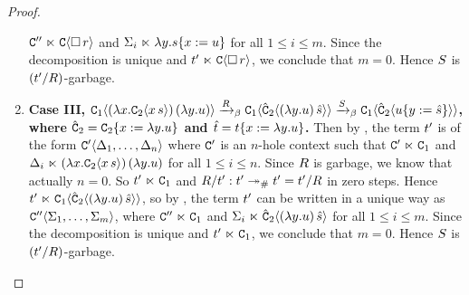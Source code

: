 \begin{proof}
\begin{enumerate}
  $\mathtt{C}'' \mathrel{\ltimes} \mathtt{C}\langle\Box\,r\rangle$ and $\Sigma_i \mathrel{\ltimes} \lambda y. s\{x := u\}$
  for all $1 \leq i \leq m$.
  Since the decomposition is unique and $t' \mathrel{\ltimes} \mathtt{C}\langle\Box\,r\rangle$,
  we conclude that $m = 0$.
  Hence $S$ is $(t'/R)$-garbage.
\item {\bf Case III, $
       \mathtt{C}_1\langle(\lambda x. \mathtt{C}_2\langle x\,s\rangle)\,(\lambda y. u)\rangle
     \mathrel{\xrightarrow{R}_\beta}
       \mathtt{C}_1\langle\hat{\mathtt{C}}_2\langle(\lambda y. u)\,\hat{s}\rangle\rangle
     \mathrel{\xrightarrow{S}_\beta}
       \mathtt{C}_1\langle\hat{\mathtt{C}}_2\langle u\{y := \hat{s}\}\rangle\rangle
    $,
    where
      $\hat{\mathtt{C}}_2 = \mathtt{C}_2\{x := \lambda y. u\}$
    and
      $\hat{t} = t\{x := \lambda y. u\}$.}
  Then by ,
  the term $t'$ is of the form $\mathtt{C}'\langle\Delta_1,\hdots,\Delta_n\rangle$
  where $\mathtt{C}'$ is an $n$-hole context such that $\mathtt{C}' \mathrel{\ltimes} \mathtt{C}_1$
  and $\Delta_i \mathrel{\ltimes} (\lambda x. \mathtt{C}_2\langle x\,s\rangle)\,(\lambda y. u)$ for all $1 \leq i \leq n$.
  Since $R$ is garbage, we know that actually $n = 0$.
  So $t' \mathrel{\ltimes} \mathtt{C}_1$ and $R/t' : t' \mathrel{\twoheadrightarrow_{\mathtt{\#}}} t' = t'/R$ in zero steps.
  Hence $t' \mathrel{\ltimes} \mathtt{C}_1\langle\hat{\mathtt{C}}_2\langle(\lambda y. u)\,\hat{s}\rangle\rangle$,
  so by , the term $t'$ can be written in a unique way as
  $\mathtt{C}''\langle\Sigma_1,\hdots,\Sigma_m\rangle$, where $\mathtt{C}'' \mathrel{\ltimes} \mathtt{C}_1$ and
  $\Sigma_i \mathrel{\ltimes} \hat{\mathtt{C}}_2\langle(\lambda y. u)\,\hat{s}\rangle$ for all $1 \leq i \leq m$.
  Since the decomposition is unique and $t' \mathrel{\ltimes} \mathtt{C}_1$, we conclude that $m = 0$.
  Hence $S$ is $(t'/R)$-garbage.
\end{enumerate}
\end{proof}

